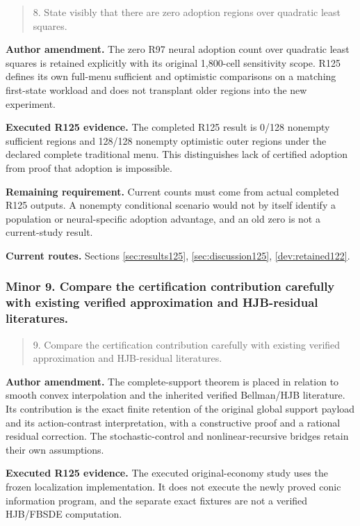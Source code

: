 \begin{quote}\small
8. State visibly that there are zero adoption regions over quadratic least squares.
\end{quote}

\noindent\textbf{Author amendment.} The zero R97 neural adoption count over quadratic least squares is retained explicitly with its original 1,800-cell sensitivity scope. R125 defines its own full-menu sufficient and optimistic comparisons on a matching first-state workload and does not transplant older regions into the new experiment.

\noindent\textbf{Executed R125 evidence.} The completed R125 result is 0/128 nonempty sufficient regions and 128/128 nonempty optimistic outer regions under the declared complete traditional menu. This distinguishes lack of certified adoption from proof that adoption is impossible.

\noindent\textbf{Remaining requirement.} Current counts must come from actual completed R125 outputs. A nonempty conditional scenario would not by itself identify a population or neural-specific adoption advantage, and an old zero is not a current-study result.

\noindent\textbf{Current routes.} Sections \ref{sec:results125}, \ref{sec:discussion125}, \ref{dev:retained122}.

\subsubsection{Minor 9. Compare the certification contribution carefully with existing verified approximation and HJB-residual literatures.}

\begin{quote}\small
9. Compare the certification contribution carefully with existing verified approximation and HJB-residual literatures.
\end{quote}

\noindent\textbf{Author amendment.} The complete-support theorem is placed in relation to smooth convex interpolation and the inherited verified Bellman/HJB literature. Its contribution is the exact finite retention of the original global support payload and its action-contrast interpretation, with a constructive proof and a rational residual correction. The stochastic-control and nonlinear-recursive bridges retain their own assumptions.

\noindent\textbf{Executed R125 evidence.} The executed original-economy study uses the frozen localization implementation. It does not execute the newly proved conic information program, and the separate exact fixtures are not a verified HJB/FBSDE computation.

